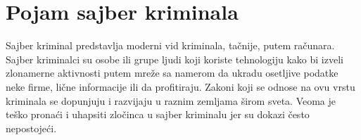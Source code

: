 \documentclass[a4paper]{article}
\newtheorem{primer}{Primer}[section]
\begin{document}







\section{Pojam sajber kriminala}
\label{pojam}

Sajber kriminal predstavlja moderni vid kriminala, tačnije, putem računara. Sajber kriminalci su osobe ili grupe ljudi koji koriste tehnologiju kako bi izveli zlonamerne aktivnosti putem mreže sa namerom da ukradu osetljive podatke neke firme, lične informacije ili da profitiraju.
Zakoni koji se odnose na ovu vrstu kriminala se dopunjuju i razvijaju u raznim zemljama širom sveta. Veoma je teško pronaći i uhapsiti zločinca u sajber kriminalu jer su dokazi često nepostojeći.
\end{document}
